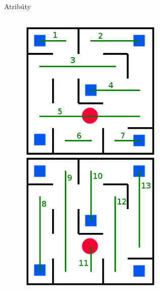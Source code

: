 \documentclass[xcolor={table}]{beamer}
\begin{document}
\begin{frame}{Atribúty}
\begin{columns}
\begin{figure}[h]
							\includegraphics[width=0.9\textwidth]{images/gulicky2}
						\end{figure}
					\end{columns}
			\end{frame}
\end{document}
